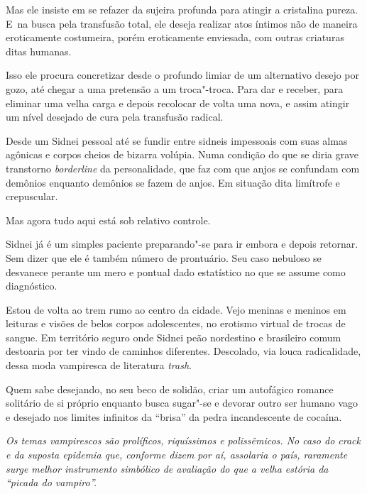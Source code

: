 Mas ele insiste em se refazer da sujeira profunda para atingir a
cristalina pureza. E~na busca pela transfusão total, ele deseja realizar
atos íntimos não de maneira eroticamente costumeira, porém eroticamente
enviesada, com outras criaturas ditas humanas.

Isso ele procura concretizar desde o profundo limiar de um alternativo
desejo por gozo, até chegar a uma pretensão a um troca"-troca. Para dar e
receber, para eliminar uma velha carga e depois recolocar de volta uma
nova, e assim atingir um nível desejado de cura pela transfusão radical.

Desde um Sidnei pessoal até se fundir entre sidneis impessoais com suas
almas agônicas e corpos cheios de bizarra volúpia. Numa condição do que
se diria grave transtorno \emph{borderline} da personalidade, que faz
com que anjos se confundam com demônios enquanto demônios se fazem de
anjos. Em situação dita limítrofe e crepuscular.

\asterisc{}

Mas agora tudo aqui está sob relativo controle.

Sidnei já é um simples paciente preparando"-se para ir embora e depois
retornar. Sem dizer que ele é também número de prontuário. Seu caso
nebuloso se desvanece perante um mero e pontual dado estatístico no que
se assume como diagnóstico.

\asterisc{}

Estou de volta ao trem rumo ao centro da cidade. Vejo meninas e meninos
em leituras e visões de belos corpos adolescentes, no erotismo virtual
de trocas de sangue. Em território seguro onde Sidnei peão nordestino e
brasileiro comum destoaria por ter vindo de caminhos diferentes.
Descolado, via louca radicalidade, dessa moda vampiresca de literatura
\emph{trash}.

Quem sabe desejando, no seu beco de solidão, criar um autofágico romance
solitário de si próprio enquanto busca sugar"-se e devorar outro ser
humano vago e desejado nos limites infinitos da ``brisa'' da pedra
incandescente de cocaína.

\begin{center}\asterisc{}\end{center}


\emph{Os temas vampirescos são prolíficos, riquíssimos e polissêmicos.
No caso do crack e da suposta epidemia que, conforme dizem por aí,
assolaria o país, raramente surge melhor instrumento simbólico de
avaliação do que a velha estória da ``picada do vampiro''.}~


